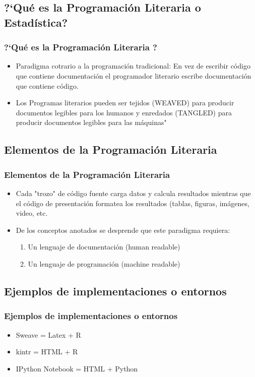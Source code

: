 \documentclass[sans serif,9pt,xcolor=dvipsnames]{beamer}%
\begin{document}
\subsection{?`Qué es la Programación Literaria o Estadística?}
\begin{frame}
  \frametitle{?`Qué es la Programación Literaria ?}
\begin{itemize}
\justifying
\item Paradigma cotrario a la programación tradicional: En vez de escribir código que contiene documentación el programador literario escribe documentación que contiene código. 
\bigskip
\item Los Programas literarios pueden ser tejidos (WEAVED) para producir documentos legibles para los humanos y enredados (TANGLED) para producir documentos legibles para las máquinas"

\end{itemize}
\end{frame}

\subsection{Elementos de la Programación Literaria}
\begin{frame}
  \frametitle{Elementos de la Programación Literaria}
\begin{itemize}
\justifying
\item Cada "trozo" de código fuente carga datos y calcula resultados mientras que el código de presentación formatea los resultados (tablas, figuras, imágenes, video, etc.\pause
\bigskip
 \item De los conceptos anotados se desprende que este paradigma requiera: \pause
\begin{enumerate}
\item Un lenguaje de documentación (human readable) \pause
\item Un lenguaje de programación (machine readable) \pause
\end{enumerate}
\end{itemize}
\end{frame}

\subsection{Ejemplos de implementaciones o entornos}
\begin{frame}
  \frametitle{Ejemplos de implementaciones o entornos}
\begin{itemize}
\justifying
\item Sweave = Latex + R
\bigskip
\item  kintr = HTML + R
\bigskip
\item IPython Notebook = HTML + Python
\end{itemize}
\end{frame}
\end{document}

